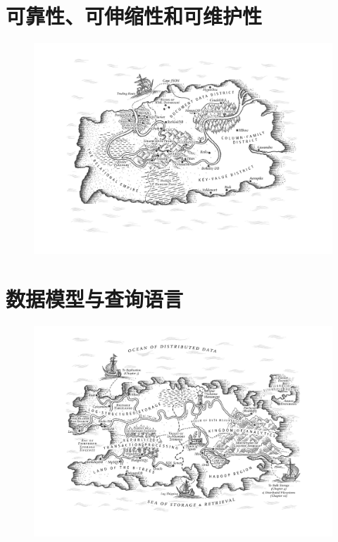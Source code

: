 \documentclass{book}
\begin{document}
\chapter{可靠性、可伸缩性和可维护性}
\label{ch:ch1}


\newpage
\begin{figure}
  \centering
  \includegraphics[width=\textwidth]{img/ch2.png}
  \label{fig:ch2}
\end{figure}

\chapter{数据模型与查询语言}
\label{ch:ch2}


\newpage
\begin{figure}
  \centering
  \includegraphics[width=\textwidth]{img/ch3.png}
  \label{fig:ch3}
\end{figure}
\end{document}
